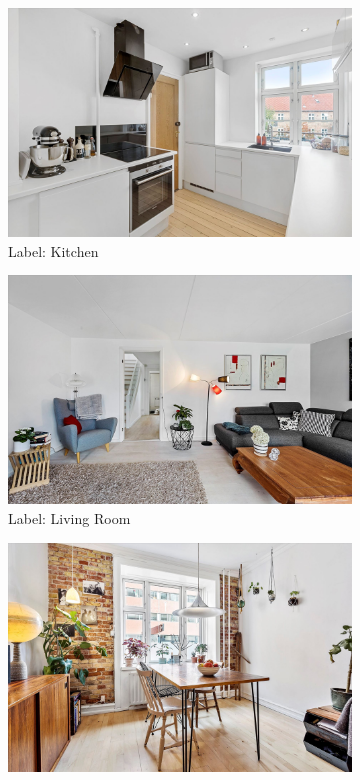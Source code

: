 \begin{figure}[H]
    \centering
    \begin{subfigure}[b]{0.3\textwidth}
      \includegraphics[width=\textwidth]{pictures/random/kitchen}
      \caption{Label: Kitchen}
      \label{fig:1}
    \end{subfigure}
    \begin{subfigure}[b]{0.3\textwidth}
      \includegraphics[width=\textwidth]{pictures/random/livingroom}
      \caption{Label: Living Room}
      \label{fig:2}
    \end{subfigure}
    \begin{subfigure}[b]{0.3\textwidth}
      \includegraphics[width=\textwidth]{pictures/random/diningroom}

\end{subfigure}
\end{figure}
